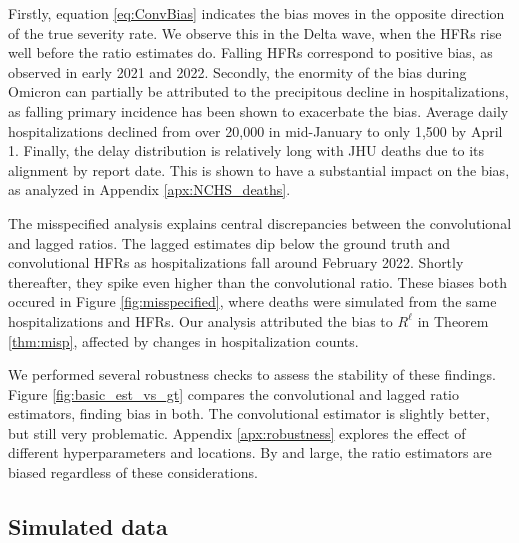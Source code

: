 \documentclass{article}
\newcommand{\ahcomment}[1]{{\color{red}[AH: #1]}}
\begin{document}
Firstly, equation \eqref{eq:ConvBias} indicates the bias moves in the opposite direction of the true severity rate. We observe this in the Delta wave, when the HFRs rise well before the ratio estimates do.  
Falling HFRs correspond to positive bias, as observed in early 2021 and 2022. Secondly, the enormity of the bias during Omicron can partially be attributed to the precipitous decline in hospitalizations, as falling primary incidence has been shown to exacerbate the bias. Average daily hospitalizations declined from over 20,000 in mid-January to only 1,500 by April 1. Finally, the delay distribution is relatively long with JHU deaths due to its alignment by report date. This is shown to have a substantial impact on the bias, as analyzed in Appendix \ref{apx:NCHS_deaths}.

The misspecified analysis explains central discrepancies between the convolutional and lagged ratios. The lagged estimates dip below the ground truth and convolutional HFRs as hospitalizations fall around February 2022. Shortly thereafter, they spike even higher than the convolutional ratio. These biases both occured in Figure \ref{fig:misspecified}, where deaths were simulated from the same hospitalizations and HFRs. Our analysis attributed the bias to $R^\ell$ in Theorem \ref{thm:misp}, affected by changes in hospitalization counts.

We performed several robustness checks to assess the stability of these findings. Figure \ref{fig:basic_est_vs_gt} compares the convolutional and lagged ratio estimators, finding bias in both. The convolutional estimator is slightly better, but still very problematic. Appendix \ref{apx:robustness} explores the effect of different hyperparameters and locations. By and large, the ratio estimators are biased regardless of these considerations. 

\subsection{Simulated data}
\end{document}
